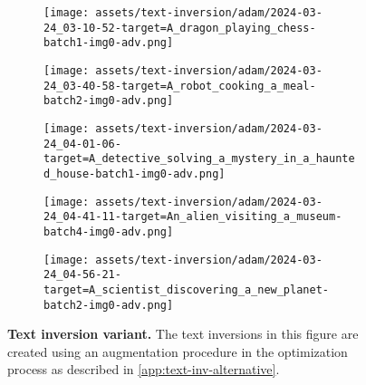 \begin{figure*}[]
\begin{minipage}[t]{.025\textwidth}
     \vspace{0pt}
\end{minipage}%
\hspace{1ex}
\begin{minipage}[t]{0.98\figwidth}
    \vspace{0pt}
    \begin{subfigure}[t]{0.2\textwidth}
        \texttt{[image: assets/text-inversion/adam/2024-03-24\_03-10-52-target=A\_dragon\_playing\_chess-batch1-img0-adv.png]}
    \end{subfigure}%
    \begin{subfigure}[t]{0.2\textwidth}
        \texttt{[image: assets/text-inversion/adam/2024-03-24\_03-40-58-target=A\_robot\_cooking\_a\_meal-batch2-img0-adv.png]}
    \end{subfigure}%
    \begin{subfigure}[t]{0.2\textwidth}
        \texttt{[image: assets/text-inversion/adam/2024-03-24\_04-01-06-target=A\_detective\_solving\_a\_mystery\_in\_a\_haunted\_house-batch1-img0-adv.png]}
    \end{subfigure}%
    \begin{subfigure}[t]{0.2\textwidth}
        \texttt{[image: assets/text-inversion/adam/2024-03-24\_04-41-11-target=An\_alien\_visiting\_a\_museum-batch4-img0-adv.png]}
    \end{subfigure}%
    \begin{subfigure}[t]{0.2\textwidth}
        \texttt{[image: assets/text-inversion/adam/2024-03-24\_04-56-21-target=A\_scientist\_discovering\_a\_new\_planet-batch2-img0-adv.png]}
    \end{subfigure}%
\end{minipage}

\caption{\textbf{Text inversion variant.}  The text inversions in this figure are created using an augmentation procedure in the optimization process as described in \cref{app:text-inv-alternative}.}
\label{fig:text-inv-adam1}
\end{figure*}